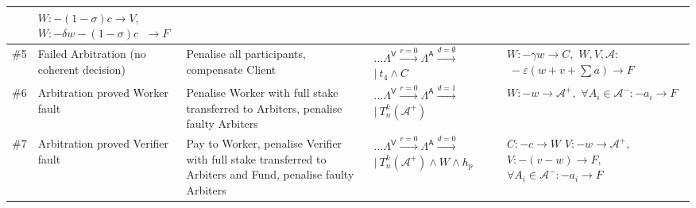 \documentclass[a4paper]{article}
\begin{document}
\begin{table}[h!]
\begin{adjustbox}{center}
\begin{tabular}{@{} l m{2.5cm} m{5cm} m{3cm} l @{}}
            & \makecell[l]{$W: -(1-\sigma)c \rightarrow V,$\\$W: -\delta w - (1 - \sigma)c$\\$\: \rightarrow F$} \\
            \midrule
            \#5 & Failed Arbitration (no coherent decision) & Penalise all participants, compensate Client 
            & \makecell[l]{$\ldots \Lambda^\mathsf{V} \xrightarrow{r=0} \Lambda^\mathsf{A} \xrightarrow{d=\emptyset}$\\ $\mid\: t_4 \wedge C$ }
            & \makecell[l]{$W: -\gamma w \rightarrow C,$\\ $W, V, \mathcal{A}:$\\$\: -\varepsilon(w+v+\sum a) \rightarrow F$} \\
            \midrule
            \#6 & Arbitration proved Worker fault & Penalise Worker with full stake transferred to Arbiters, penalise faulty Arbiters 
            & \makecell[l]{$\ldots \Lambda^\mathsf{V} \xrightarrow{r=0} \Lambda^\mathsf{A} \xrightarrow{d=1}$\\ $\mid\: T^k_n(\mathcal{A^+})$ }
            & \makecell[l]{$W: -w \rightarrow \mathcal{A^+},$ \\ $\forall A_i \in \mathcal{A^-}: -a_i \rightarrow F$} \\
            \midrule
            \#7 & Arbitration proved Verifier fault & Pay to Worker, penalise Verifier with full stake transferred to Arbiters and Fund, penalise faulty Arbiters 
            & \makecell[l]{$\ldots \Lambda^\mathsf{V} \xrightarrow{r=0} \Lambda^\mathsf{A} \xrightarrow{d=0}$\\ $\mid\: T^k_n(\mathcal{A^+}) \wedge W \wedge h_p$ }
            & \makecell[l]{$C: -c \rightarrow W$\\$V: -w \rightarrow \mathcal{A^+},$\\ $V: -(v-w) \rightarrow F,$\\ $\forall A_i \in \mathcal{A^-}: -a_i \rightarrow F$} \\
            \bottomrule
        \end{tabular}
    \end{adjustbox}
\end{table}
\end{document}

